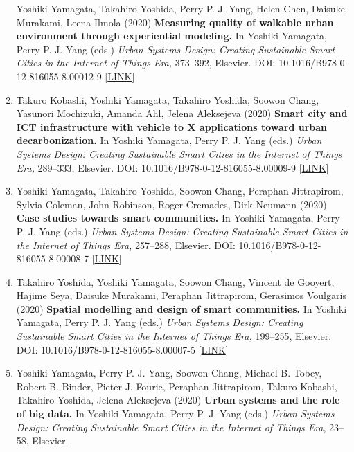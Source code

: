 \documentclass[
]{book}
\begin{document}
\begin{enumerate}
  Yoshiki Yamagata, Takahiro Yoshida, Perry P. J. Yang, Helen Chen, Daisuke Murakami, Leena Ilmola (2020)
  \textbf{Measuring quality of walkable urban environment through experiential modeling.}
  In Yoshiki Yamagata, Perry P. J. Yang (eds.)
  \emph{Urban Systems Design: Creating Sustainable Smart Cities in the Internet of Things Era,} 373--392, Elsevier.
  DOI: 10.1016/B978-0-12-816055-8.00012-9 {[}\href{https://www.elsevier.com/books/urban-systems-design/yamagata/978-0-12-816055-8}{LINK}{]}
\item
  Takuro Kobashi, Yoshiki Yamagata, Takahiro Yoshida, Soowon Chang, Yasunori Mochizuki, Amanda Ahl, Jelena Aleksejeva (2020)
  \textbf{Smart city and ICT infrastructure with vehicle to X applications toward urban decarbonization.}
  In Yoshiki Yamagata, Perry P. J. Yang (eds.)
  \emph{Urban Systems Design: Creating Sustainable Smart Cities in the Internet of Things Era,} 289--333, Elsevier.
  DOI: 10.1016/B978-0-12-816055-8.00009-9 {[}\href{https://www.elsevier.com/books/urban-systems-design/yamagata/978-0-12-816055-8}{LINK}{]}
\item
  Yoshiki Yamagata, Takahiro Yoshida, Soowon Chang, Peraphan Jittrapirom, Sylvia Coleman, John Robinson, Roger Cremades, Dirk Neumann (2020)
  \textbf{Case studies towards smart communities.}
  In Yoshiki Yamagata, Perry P. J. Yang (eds.)
  \emph{Urban Systems Design: Creating Sustainable Smart Cities in the Internet of Things Era,} 257--288, Elsevier.
  DOI: 10.1016/B978-0-12-816055-8.00008-7 {[}\href{https://www.elsevier.com/books/urban-systems-design/yamagata/978-0-12-816055-8}{LINK}{]}
\item
  Takahiro Yoshida, Yoshiki Yamagata, Soowon Chang, Vincent de Gooyert, Hajime Seya, Daisuke Murakami, Peraphan Jittrapirom, Gerasimos Voulgaris (2020)
  \textbf{Spatial modelling and design of smart communities.}
  In Yoshiki Yamagata, Perry P. J. Yang (eds.)
  \emph{Urban Systems Design: Creating Sustainable Smart Cities in the Internet of Things Era,} 199--255, Elsevier.
  DOI: 10.1016/B978-0-12-816055-8.00007-5 {[}\href{https://www.elsevier.com/books/urban-systems-design/yamagata/978-0-12-816055-8}{LINK}{]}
\item
  Yoshiki Yamagata, Perry P. J. Yang, Soowon Chang, Michael B. Tobey, Robert B. Binder, Pieter J. Fourie, Peraphan Jittrapirom, Takuro Kobashi, Takahiro Yoshida, Jelena Aleksejeva (2020)
  \textbf{Urban systems and the role of big data.}
  In Yoshiki Yamagata, Perry P. J. Yang (eds.)
  \emph{Urban Systems Design: Creating Sustainable Smart Cities in the Internet of Things Era}, 23--58, Elsevier.

\end{enumerate}
\end{document}

